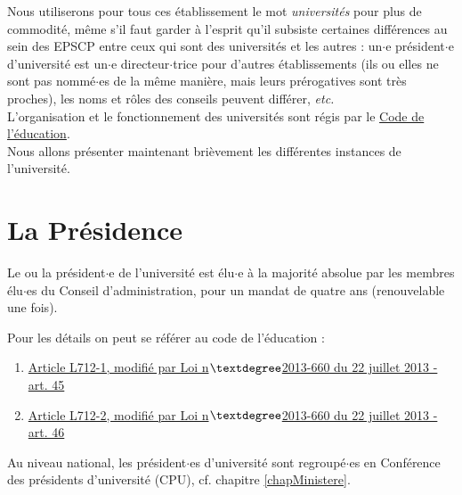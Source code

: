 Nous utiliserons pour tous ces \'etablissement le mot \textit{universit\'es} pour plus de commodit\'e,
m\^eme s'il faut garder \`a l'esprit qu'il subsiste certaines diff\'erences au sein des EPSCP entre ceux
qui sont des universit\'es et les autres : un$\cdot$e pr\'esident$\cdot$e d'universit\'e est un$\cdot$e directeur$\cdot$trice pour d'autres
\'etablissements (ils ou elles ne sont pas nomm\'e$\cdot$es de la m\^eme mani\`ere, mais leurs pr\'erogatives sont
tr\`es proches), les noms et r\^oles des conseils peuvent diff\'erer, {\em etc.}\\

L'organisation et le fonctionnement des universit\'es sont r\'egis
par le \href{http://www.legifrance.gouv.fr/affichCode.do?cidTexte=LEGITEXT000006071191}{Code de l'\'education}. \\

Nous allons pr\'esenter maintenant bri\`evement les diff\'erentes instances de l'universit\'e.



\section{La Pr\'esidence}
Le ou la pr\'esident$\cdot$e de l'universit\'e est \'elu$\cdot$e \`a la majorit\'e absolue par les membres \'elu$\cdot$es du Conseil d'administration, 
pour un mandat de quatre ans (renouvelable une fois). 

Pour les d\'etails on peut se r\'ef\'erer au code de l'\'education :
\begin{enumerate}
 \item \href{https://www.legifrance.gouv.fr/affichCodeArticle.do;jsessionid=C8BFF801F2976E9272297AB33338C553.tpdila14v_3?idArticle=LEGIARTI000027747943&cidTexte=LEGITEXT000006071191&dateTexte=20170113}{Article L712-1, modifi\'e par Loi n$\textdegree$2013-660 du 22 juillet 2013 - art. 45}
 \item \href{https://www.legifrance.gouv.fr/affichCodeArticle.do;jsessionid=C8BFF801F2976E9272297AB33338C553.tpdila14v_3?idArticle=LEGIARTI000027747947&cidTexte=LEGITEXT000006071191&dateTexte=20170113}{Article L712-2, modifi\'e par Loi n$\textdegree$2013-660 du 22 juillet 2013 - art. 46}
\end{enumerate}

Au niveau national, les pr\'esident$\cdot$es d'universit\'e sont regroup\'e$\cdot$es en Conf\'erence des pr\'esidents d'universit\'e (CPU), cf. chapitre \ref{chapMinistere}.

